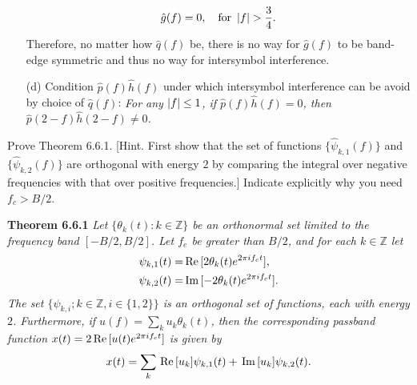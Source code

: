 \documentclass{assignment}
\begin{document}
\begin{sol}
\begin{itemize}
\begin{align}
            \hat{g}(f)=0,\quad\text{for }\left\lvert f\right\rvert>\frac{3}{4}.
        \end{align}
        Therefore, no matter how $\hat{q}(f)$ be, there is no way for $\hat{g}(f)$ to be band-edge symmetric and thus no way for intersymbol interference.
        \item[(d)] Condition $\hat{p}(f)\hat{h}(f)$ under which intersymbol interference can be avoid by choice of $\hat{q}(f)$: \emph{For any $\left\lvert f\right\rvert\leq 1$, if $\hat{p}(f)\hat{h}(f)=0$, then $\hat{p}(2-f)\hat{h}(2-f)\neq 0$.}
    \end{itemize}
\end{sol}

\begin{prob} Prove Theorem 6.6.1. [Hint. First show that the set of functions $\{\hat{\psi}_{k,1}(f)\}$ and $\{\hat{\psi}_{k,2}(f)\}$ are orthogonal with energy $2$ by comparing the integral over negative frequencies with that over positive frequencies.] Indicate explicitly why you need $f_c>B/2$.

    \begin{framed}
        \textbf{Theorem 6.6.1} \itshape Let $\{\theta_k(t):k\in\mathbb{Z}\}$ be an orthonormal set limited to the frequency band $[-B/2,B/2]$. Let $f_e$ be greater than $B/2$, and for each $k\in\mathbb{Z}$ let
        \begin{align*}
            \psi_{k,1}(t)=&\,\text{Re}\,[2\theta_k(t)e^{2\pi if_ct}],\\
            \psi_{k,2}(t)=&\,\text{Im}\,[-2\theta_k(t)e^{2\pi if_ct}].
        \end{align*}
        The set $\{\psi_{k,i};k\in\mathbb{Z},i\in\{1,2\}\}$ is an orthogonal set of functions, each with energy $2$. Furthermore, if $u(f)=\sum_ku_k\theta_k(t)$, then the corresponding passband function $x(t)=2\,\text{Re}\,[u(t)e^{2\pi if_ct}]$ is given by
        \[
            x(t)=\sum_k\,\text{Re}\,[u_k]\psi_{k,1}(t)+\,\text{Im}\,[u_k]\psi_{k,2}(t).
        \]
    \end{framed}
\end{prob}
\end{document}
